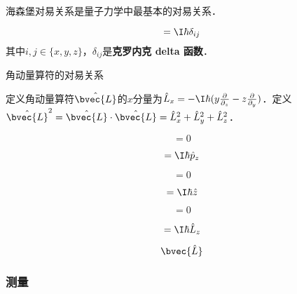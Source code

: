 海森堡对易关系是量子力学中最基本的对易关系．



\begin{corollary}{}

\begin{equation}
[\hat{i}, \hat{p}_j]=\I\hbar\delta_{ij}
\end{equation}
其中$i, j\in\{x, y, z\}$，$\delta_{ij}$是\textbf{克罗内克 delta 函数}．
\end{corollary}

\begin{theorem}{角动量算符的对易关系}

定义角动量算符$\hat{\bvec{L}}$的$x$分量为$\hat{L}_x=-\I\hbar(y\frac{\partial}{\partial_z}-z\frac{\partial}{\partial _y})$．定义$\hat{\bvec{L}}^2=\hat{\bvec{L}}\cdot \hat{\bvec{L}}=\hat{L}_x^2+\hat{L}_y^2+\hat{L}_z^2$．

\begin{equation}
[\hat{p}_x, \hat{L}_x]=0
\end{equation}

\begin{equation}
[\hat{p}_x, \hat{L}_y]=\I\hbar\hat{p}_z
\end{equation}

\begin{equation}
[\hat{x}, \hat{L}_x]=0
\end{equation}

\begin{equation}
[\hat{x}, \hat{L}_y]=\I\hbar\hat{z}
\end{equation}

\begin{equation}
[\hat{L}_x, \hat{L}_x]=0
\end{equation}

\begin{equation}
[\hat{L}_x, \hat{L}_y]=\I\hbar\hat{L}_z
\end{equation}

\begin{equation}
\bvec{\hat{L}}
\end{equation}

\end{theorem}







\subsubsection{测量}

